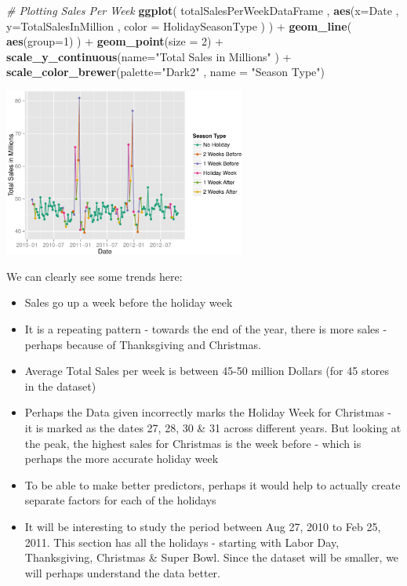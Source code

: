 \documentclass[]{article}
\newenvironment{Shaded}{\begin{snugshade}}{\end{snugshade}}
\newcommand{\KeywordTok}[1]{\textcolor[rgb]{0.13,0.29,0.53}{\textbf{{#1}}}}
\newcommand{\DataTypeTok}[1]{\textcolor[rgb]{0.13,0.29,0.53}{{#1}}}
\newcommand{\DecValTok}[1]{\textcolor[rgb]{0.00,0.00,0.81}{{#1}}}
\newcommand{\StringTok}[1]{\textcolor[rgb]{0.31,0.60,0.02}{{#1}}}
\newcommand{\CommentTok}[1]{\textcolor[rgb]{0.56,0.35,0.01}{\textit{{#1}}}}
\newcommand{\NormalTok}[1]{{#1}}
\begin{document}
\begin{Shaded}
\begin{Highlighting}[]
\CommentTok{# Plotting Sales Per Week}
\KeywordTok{ggplot}\NormalTok{( totalSalesPerWeekDataFrame , }
        \KeywordTok{aes}\NormalTok{(}\DataTypeTok{x=}\NormalTok{Date , }\DataTypeTok{y=}\NormalTok{TotalSalesInMillion , }\DataTypeTok{color =} \NormalTok{HolidaySeasonType ) ) +}\StringTok{ }
\StringTok{  }\KeywordTok{geom_line}\NormalTok{( }\KeywordTok{aes}\NormalTok{(}\DataTypeTok{group=}\DecValTok{1}\NormalTok{) ) +}\StringTok{ }
\StringTok{  }\KeywordTok{geom_point}\NormalTok{(}\DataTypeTok{size =} \DecValTok{2}\NormalTok{) +}
\StringTok{  }\KeywordTok{scale_y_continuous}\NormalTok{(}\DataTypeTok{name=}\StringTok{"Total Sales in Millions"} \NormalTok{) +}
\StringTok{  }\KeywordTok{scale_color_brewer}\NormalTok{(}\DataTypeTok{palette=}\StringTok{"Dark2"} \NormalTok{, }\DataTypeTok{name =} \StringTok{"Season Type"}\NormalTok{)}
\end{Highlighting}
\end{Shaded}

\includegraphics[width=300px]{PredictingWeeklySalesAtWalmart_files/figure-latex/plottingSalesPerWeek-1}

We can clearly see some trends here:

\begin{itemize}
\itemsep1pt\parskip0pt
\item
  Sales go up a week before the holiday week
\item
  It is a repeating pattern - towards the end of the year, there is more
  sales - perhaps because of Thanksgiving and Christmas.
\item
  Average Total Sales per week is between 45-50 million Dollars (for 45
  stores in the dataset)
\item
  Perhaps the Data given incorrectly marks the Holiday Week for
  Christmas - it is marked as the dates 27, 28, 30 \& 31 across
  different years. But looking at the peak, the highest sales for
  Christmas is the week before - which is perhaps the more accurate
  holiday week
\item
  To be able to make better predictors, perhaps it would help to
  actually create separate factors for each of the holidays
\item
  It will be interesting to study the period between Aug 27, 2010 to Feb
  25, 2011. This section has all the holidays - starting with Labor Day,
  Thanksgiving, Christmas \& Super Bowl. Since the dataset will be
  smaller, we will perhaps understand the data better.
\end{itemize}
\end{document}
